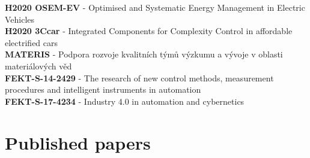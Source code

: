 \documentclass[%
  14pt,       				%
  a4paper,    				%
	twoside,      			%
	unicode,						%
]{extreport}				  %
\begin{document}
\noindent\textbf{H2020 OSEM-EV} - Optimised and Systematic Energy Management in Electric Vehicles\\

\noindent\textbf{H2020 3Ccar} - Integrated Components for Complexity Control in affordable electrified cars\\

\noindent\textbf{MATERIS} - Podpora rozvoje kvalitních týmů výzkumu a vývoje v oblasti materiálových věd\\

\noindent\textbf{FEKT-S-14-2429} - The research of new control methods, measurement procedures and intelligent instruments in automation\\

\noindent\textbf{FEKT-S-17-4234} - Industry 4.0 in automation and cybernetics\\

\section*{Published papers}

\statementlstpg
\end{document}
